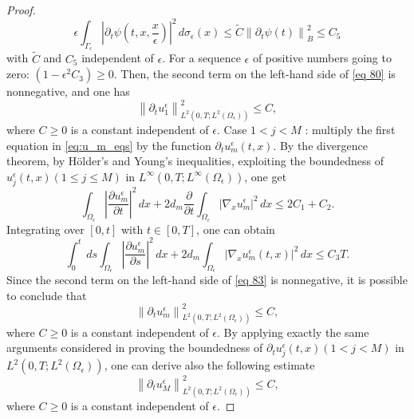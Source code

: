 \begin{proof}
$$
\epsilon \int_{\Gamma_{\epsilon}}\left|\partial_{t} \psi\left(t, x, \frac{x}{\epsilon}\right)\right|^{2} \, d  \sigma_{\epsilon}(x) \leq \tilde{C}\left\|\partial_{t} \psi(t)\right\|_{B}^{2} \leq C_{5}
$$
with $\tilde{C}$ and $C_{5}$ independent of $\epsilon$. For a sequence $\epsilon$ of positive numbers going to zero: $\left(1-\epsilon^{2} C_{3}\right) \geq 0$. Then, the second term on the left-hand side of \eqref{eq 80} is nonnegative, and one has
\begin{equation}
  \left\|\partial_{t} u_{1}^{\epsilon}\right\|_{L^{2}\left(0, T ; L^{2}\left(\Omega_{\epsilon}\right)\right)}^{2} \leq C,
\label{eq 81}\end{equation}
where $C \geq 0$ is a constant independent of $\epsilon$.
Case $1<j<M$ : multiply the first equation in \eqref{eq:u_m_eqs} by the function $\partial_{t} u_{m}^{\epsilon}(t, x)$. By the divergence theorem, by Hölder's and Young's inequalities, exploiting the boundedness of $u_{j}^{\epsilon}(t, x)(1 \leq j \leq M)$ in $L^{\infty}\left(0, T ; L^{\infty}\left(\Omega_{\epsilon}\right)\right)$, one get
\begin{equation}
  \int_{\Omega_{\epsilon}}\left|\frac{\partial u_{m}^{\epsilon}}{\partial t}\right|^{2} \, d  x+2 d_{m} \frac{\partial}{\partial t} \int_{\Omega_{\epsilon}}\left|\nabla_{x} u_{m}^{\epsilon}\right|^{2} \, d  x \leq 2 C_{1}+C_{2}.
\label{eq 82}\end{equation}
Integrating over $[0, t]$ with $t \in[0, T]$, one can obtain
\begin{equation}
  \int_{0}^{t} \, d  s \int_{\Omega_{\epsilon}}\left|\frac{\partial u_{m}^{\epsilon}}{\partial s}\right|^{2} \, d  x+2 d_{m} \int_{\Omega_{\epsilon}}\left|\nabla_{x} u_{m}^{\epsilon}(t, x)\right|^{2} \, d  x \leq C_{3} T.
\label{eq 83}\end{equation}
Since the second term on the left-hand side of \eqref{eq 83} is nonnegative, it is possible to conclude that 
\begin{equation}
  \left\|\partial_{t} u_{m}^{\epsilon}\right\|_{L^{2}\left(0, T ; L^{2}\left(\Omega_{\epsilon}\right)\right)}^{2} \leq C,
\label{eq 84}\end{equation}
where $C \geq 0$ is a constant independent of $\epsilon$.
By applying exactly the same arguments considered in proving the boundedness of $\partial_{t} u_{j}^{\epsilon}(t, x)(1<j<M)$ in $L^{2}\left(0, T ; L^{2}\left(\Omega_{\epsilon}\right)\right)$, one can derive also the following estimate
\begin{equation}
  \left\|\partial_{t} u_{M}^{\epsilon}\right\|_{L^{2}\left(0, T ; L^{2}\left(\Omega_{\epsilon}\right)\right)}^{2} \leq C,
\label{eq 85}\end{equation}
where $C \geq 0$ is a constant independent of $\epsilon$.
\end{proof}
